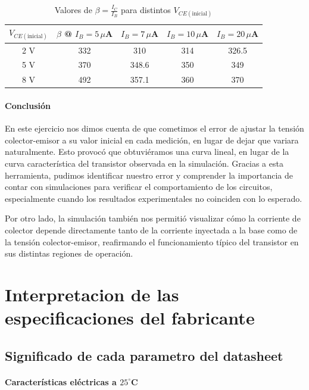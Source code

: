 \documentclass[chaptersright]{informeutn}
\begin{document}
    \begin{table}[H]
      \centering
      \begin{tabular}{|c|c|c|c|c|}
      \hline
      $V_{CE(\text{inicial})}$ & $\beta$ @ $I_B=5\,\mu$A & $I_B=7\,\mu$A & $I_B=10\,\mu$A & $I_B=20\,\mu$A \\
      \hline
      2 V  & 332   & 310    & 314   & 326.5 \\
      5 V  & 370   & 348.6  & 350   & 349   \\
      8 V  & 492   & 357.1  & 360   & 370   \\
      \hline
      \end{tabular}
      \caption{Valores de $\beta = \frac{I_C}{I_B}$ para distintos $V_{CE(\text{inicial})}$}
    \end{table}

    \subsubsection{Conclusión}
     En este ejercicio nos dimos cuenta de que cometimos el error de ajustar la tensión colector-emisor a su valor 
     inicial en cada medición, en lugar de dejar que variara naturalmente. Esto provocó que obtuviéramos una curva 
     lineal, en lugar de la curva característica del transistor observada en la simulación. Gracias a esta herramienta,
     pudimos identificar nuestro error y comprender la importancia de contar con simulaciones para verificar el 
     comportamiento de los circuitos, especialmente cuando los resultados experimentales no coinciden con lo esperado.

     Por otro lado, la simulación también nos permitió visualizar cómo la corriente de colector depende directamente
     tanto de la corriente inyectada a la base como de la tensión colector-emisor, reafirmando el funcionamiento típico
     del transistor en sus distintas regiones de operación.

\chapter{Interpretacion de las especificaciones del fabricante}

\section{Significado de cada parametro del datasheet}


\subsubsection{Características eléctricas a $25^\circ$C }
\end{document}
